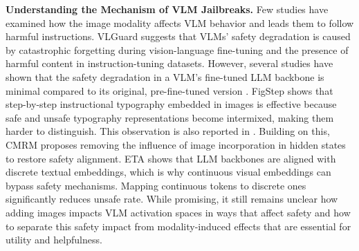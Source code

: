\textbf{Understanding the Mechanism of VLM Jailbreaks.} 
Few studies have examined how the image modality affects VLM behavior and leads them to follow harmful instructions. VLGuard \cite{zong2024safety} suggests that VLMs' safety degradation is caused by catastrophic forgetting during vision-language fine-tuning and the presence of harmful content in instruction-tuning datasets. However, several studies have shown that the safety degradation in a VLM's fine-tuned LLM backbone is minimal compared to its original, pre-fine-tuned version \cite{guo2024vllm, luo2024jailbreakv}. FigStep \cite{gong2023figstep} shows that step-by-step instructional typography embedded in images is effective because safe and unsafe typography representations become intermixed, making them harder to distinguish. This observation is also reported in \cite{liu2024unraveling, guo2024vllm}. Building on this, CMRM \cite{liu2024unraveling} proposes removing the influence of image incorporation in hidden states to restore safety alignment. ETA \cite{ding2024eta} shows that LLM backbones are aligned with discrete textual embeddings, which is why continuous visual embeddings can bypass safety mechanisms. Mapping continuous tokens to discrete ones significantly reduces unsafe rate. While promising, it still remains unclear how adding images impacts VLM activation spaces in ways that affect safety and how to separate this safety impact from modality-induced effects that are essential for utility and helpfulness.

